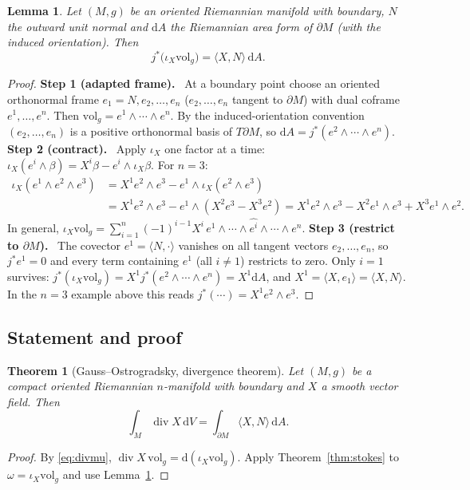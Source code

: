 \documentclass[11pt,a4paper]{article}
\newcounter{thm}[section]
\numberwithin{equation}{section}
\theoremstyle{definition}
\theoremstyle{plain}
\newtheorem{theorem}[thm]{Theorem}
\newtheorem{lemma}[thm]{Lemma}
\newcommand{\Step}[2]{\textbf{Step #1 (#2).}\ }
\newcommand{\dd}{\mathrm{d}}
\newcommand{\vol}{\mathrm{vol}}
\newcommand{\pb}{{}^{*}}                            %
\begin{document}
\begin{lemma}\label{lem:fluxbdry}
Let $(M,g)$ be an oriented Riemannian manifold with boundary, $N$ the outward unit normal and $\dd A$ the Riemannian area form of $\partial M$ (with the induced orientation). Then
\[
j\pb\bigl(\iota_X\vol_g\bigr)=\langle X,N\rangle\,\dd A .
\]
\end{lemma}
\begin{proof}
\Step{1}{adapted frame} At a boundary point choose an oriented orthonormal frame $e_1=N,e_2,\dots,e_n$ ($e_2,\dots,e_n$ tangent to $\partial M$) with dual coframe $e^1,\dots,e^n$. Then $\vol_g=e^1\wedge\cdots\wedge e^n$. By the induced-orientation convention $(e_2,\dots,e_n)$ is a positive orthonormal basis of $T\partial M$, so $\dd A=j\pb(e^2\wedge\cdots\wedge e^n)$.
\Step{2}{contract} Apply $\iota_X$ one factor at a time: $\iota_X(e^i\wedge\beta)=X^i\beta-e^i\wedge\iota_X\beta$. For $n=3$:
\begin{align*}
\iota_X(e^1\wedge e^2\wedge e^3)&=X^1e^2\wedge e^3-e^1\wedge\iota_X(e^2\wedge e^3)\\
&=X^1e^2\wedge e^3-e^1\wedge(X^2e^3-X^3e^2)=X^1e^2\wedge e^3-X^2e^1\wedge e^3+X^3e^1\wedge e^2 .
\end{align*}
In general, $\iota_X\vol_g=\sum_{i=1}^n(-1)^{i-1}X^i\,e^1\wedge\cdots\wedge\widehat{e^i}\wedge\cdots\wedge e^n$.
\Step{3}{restrict to $\partial M$} The covector $e^1=\langle N,\cdot\rangle$ vanishes on all tangent vectors $e_2,\dots,e_n$, so $j\pb e^1=0$ and every term containing $e^1$ (all $i\ne1$) restricts to zero. Only $i=1$ survives: $j\pb(\iota_X\vol_g)=X^1j\pb(e^2\wedge\cdots\wedge e^n)=X^1\dd A$, and $X^1=\langle X,e_1\rangle=\langle X,N\rangle$. In the $n=3$ example above this reads $j\pb(\cdots)=X^1e^2\wedge e^3$.
\end{proof}

\subsection{Statement and proof}

\begin{theorem}[Gauss--Ostrogradsky, divergence theorem]\label{thm:gauss}
Let $(M,g)$ be a compact oriented Riemannian $n$-manifold with boundary and $X$ a smooth vector field. Then
\[
\int_M\operatorname{div}X\,\dd V=\int_{\partial M}\langle X,N\rangle\,\dd A .
\]
\end{theorem}
\begin{proof}
By \eqref{eq:divmu}, $\operatorname{div}X\,\vol_g=\dd(\iota_X\vol_g)$. Apply Theorem~\ref{thm:stokes} to $\omega=\iota_X\vol_g$ and use Lemma~\ref{lem:fluxbdry}.
\end{proof}
\end{document}
